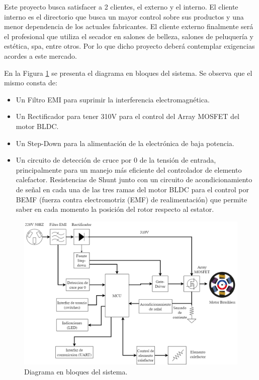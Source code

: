\documentclass[
11pt, %
codirector, %
]{charter}
\begin{document}
Este proyecto busca satisfacer a 2 clientes, el externo y el interno.
El cliente interno es el directorio que busca un mayor control sobre sus productos y una menor dependencia de los actuales fabricantes.
El cliente externo finalmente será el profesional que utiliza el secador en salones de belleza, salones de peluquería y estética, spa, entre otros. Por lo que dicho proyecto deberá contemplar exigencias acordes a este mercado.

En la Figura \ref{fig:diagBloques} se presenta el diagrama en bloques del sistema. Se observa que el mismo consta de:
\begin{itemize}
	\item Un Filtro EMI para suprimir la interferencia electromagnética.
	\item Un Rectificador para tener 310V para el control del Array MOSFET del motor BLDC.
	\item Un Step-Down para la alimentación de la electrónica de baja potencia.
	\item Un circuito de detección de cruce por 0 de la tensión de entrada, principalmente para un manejo más eficiente del controlador de elemento calefactor.
	      Resistencias de Shunt junto con un circuito de acondicionamiento de señal en cada una de las tres ramas del motor BLDC para el control por BEMF (fuerza contra electromotriz (EMF) de realimentación) que permite saber en cada momento la posición del rotor respecto al estator.
\end{itemize}



\begin{figure}[htpb]
	\centering
	\includegraphics[width=1\textwidth]{./Figuras/Diagrama_general_v1.drawio.png}
	\caption{Diagrama en bloques del sistema.}
	\label{fig:diagBloques}
\end{figure}
\end{document}
